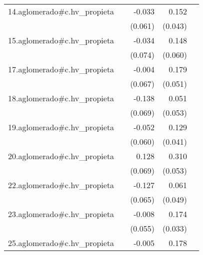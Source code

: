 {\begin{longtable}{l*{4}{D{.}{.}{-1}}}
\addlinespace
14.aglomerado#c.hv\_propieta&                     &      -0.033         &       0.152\sym{***}&                     \\
            &                     &     (0.061)         &     (0.043)         &                     \\
\addlinespace
15.aglomerado#c.hv\_propieta&                     &      -0.034         &       0.148\sym{*}  &                     \\
            &                     &     (0.074)         &     (0.060)         &                     \\
\addlinespace
17.aglomerado#c.hv\_propieta&                     &      -0.004         &       0.179\sym{***}&                     \\
            &                     &     (0.067)         &     (0.051)         &                     \\
\addlinespace
18.aglomerado#c.hv\_propieta&                     &      -0.138\sym{*}  &       0.051         &                     \\
            &                     &     (0.069)         &     (0.053)         &                     \\
\addlinespace
19.aglomerado#c.hv\_propieta&                     &      -0.052         &       0.129\sym{**} &                     \\
            &                     &     (0.060)         &     (0.041)         &                     \\
\addlinespace
20.aglomerado#c.hv\_propieta&                     &       0.128         &       0.310\sym{***}&                     \\
            &                     &     (0.069)         &     (0.053)         &                     \\
\addlinespace
22.aglomerado#c.hv\_propieta&                     &      -0.127         &       0.061         &                     \\
            &                     &     (0.065)         &     (0.049)         &                     \\
\addlinespace
23.aglomerado#c.hv\_propieta&                     &      -0.008         &       0.174\sym{***}&                     \\
            &                     &     (0.055)         &     (0.033)         &                     \\
\addlinespace
25.aglomerado#c.hv\_propieta&                     &      -0.005         &       0.178\sym{***}&                     \\

\end{longtable}}
